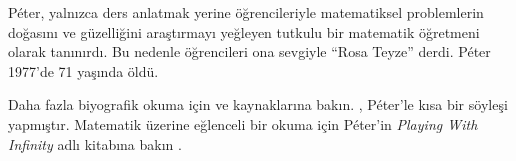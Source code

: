 P\'{e}ter, yalnızca ders anlatmak yerine öğrencileriyle matematiksel
problemlerin doğasını ve güzelliğini araştırmayı yeğleyen tutkulu bir
matematik öğretmeni olarak tanınırdı. Bu nedenle öğrencileri ona sevgiyle
``Rosa Teyze'' derdi. P\'eter 1977'de 71 yaşında öldü.

\begin{reading}
Daha fazla biyografik okuma için \citep{Oconnor2014} ve
\citep{Andrasfai1986} kaynaklarına bakın. \citet{Tamassy1994}, P\'eter'le kısa
bir söyleşi yapmıştır. Matematik üzerine eğlenceli bir okuma için P\'eter'in
\emph{Playing With Infinity} adlı kitabına bakın \citep{Peter2010}.
\end{reading}

